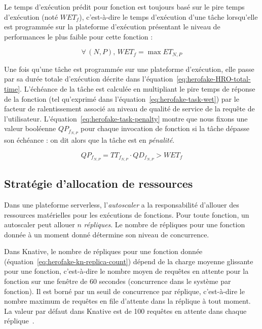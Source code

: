 Le temps d'exécution prédit pour fonction est toujours basé sur le pire temps d'exécution (noté $WET_{f}$), c'est-à-dire le temps d'exécution d'une tâche lorsqu'elle est programmée sur la plateforme d'exécution présentant le niveau de performances le plus faible pour cette fonction :

\begin{equation}
    \forall \, (N, P), \, WET_{f} = \max ET_{N, P}
\label{eq:herofake-task-wet}
\end{equation}

Une fois qu'une tâche est programmée sur une plateforme d'exécution, elle passe par sa durée totale d'exécution décrite dans l'équation~\ref{eq:herofake-HRO-total-time}. L'échéance de la tâche est calculée en multipliant le pire temps de réponse de la fonction (tel qu'exprimé dans l'équation~\ref{eq:herofake-task-wet}) par le facteur de ralentissement associé au niveau de qualité de service de la requête de l'utilisateur. L'équation~\ref{eq:herofake-task-penalty} montre que nous fixons une valeur booléenne $QP_{f_{N, P}}$ pour chaque invocation de fonction si la tâche dépasse son échéance : on dit alors que la tâche est en \textit{pénalité}.

\begin{equation}
    QP_{f_{N, P}} = TT_{f_{N, P}} \cdot QD_{f_{N, P}} > WET_{f}
\label{eq:herofake-task-penalty}
\end{equation}

\subsection{Stratégie d'allocation de ressources} \label{section:herofake-autoscaling-strategy}

Dans une plateforme serverless, l'\textit{autoscaler} a la responsabilité d'allouer des ressources matérielles pour les exécutions de fonctions. Pour toute fonction, un autoscaler peut allouer $n$ \textit{répliques}. Le nombre de répliques pour une fonction donnée à un moment donné détermine son niveau de concurrence.

Dans Knative, le nombre de répliques pour une fonction donnée (équation~\ref{eq:herofake-kn-replica-count}) dépend de la charge moyenne glissante pour une fonction, c'est-à-dire le nombre moyen de requêtes en attente pour la fonction sur une fenêtre de 60 secondes (concurrence dans le système par fonction). Il est borné par un seuil de concurrence par réplique, c'est-à-dire le nombre maximum de requêtes en file d'attente dans la réplique à tout moment. La valeur par défaut dans Knative est de 100 requêtes en attente dans chaque réplique~\cite{knative-autoscaling}.

